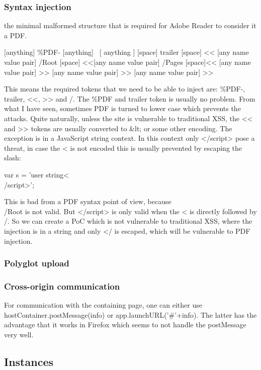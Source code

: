 \documentclass[10pt, conference, compsocconf]{IEEEtran}
\begin{document}
\subsubsection{Syntax injection}

the minimal malformed structure that is required for Adobe 
Reader to consider it a PDF. 

[anything] \%PDF- [anything] \
[ anything ] [space] trailer [space] << [any name value pair] 
/Root [space] <<[any name value pair] /Pages [space]<< [any name value pair] 
>> [any name value pair] >> [any name value pair] >>

This means the required tokens that we need to be able to 
inject are: \%PDF-, trailer, <<, >> and /.
The \%PDF and trailer token is usually no problem. From what 
I have seen, sometimes PDF is turned to lower case which 
prevents the attacks. Quite naturally, unless the site is 
vulnerable to traditional XSS, the << and >> tokens are usually 
converted to \&lt; or some other encoding. The exception is in 
a JavaScript string context. In this context only </script> 
pose a threat, in case the < is not encoded this is usually 
prevented by escaping the slash:

var s = 'user string<\\/script>';

This is bad from a PDF syntax point of view, because \\/Root is 
not valid. But </script> is only valid when the < is directly 
followed by /. So we can create a PoC which is not vulnerable to 
traditional XSS, where the injection is  in a string and only </ 
is escaped, which will be vulnerable to PDF injection.


\subsubsection{Polyglot upload}



\subsubsection{Cross-origin communication}

For communication with the containing page, one can either use 
hostContainer.postMessage(info) or app.launchURL('\#'+info). The 
latter has the advantage that it works in Firefox which seems 
to not handle the postMessage very well.


\subsection{Instances}
\end{document}
